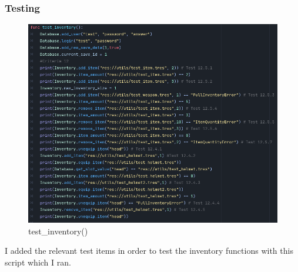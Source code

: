 \documentclass{article}
\begin{document}
        \subsubsection{Testing}
        \begin{figure}[H]
                \centering
                \includegraphics[width=0.8\columnwidth]{images/development/test_inventory.PNG}
                \caption{test\_inventory()}
        \end{figure}
        I added the relevant test items in order to test the inventory functions with this script which I ran.\\
\end{document}
